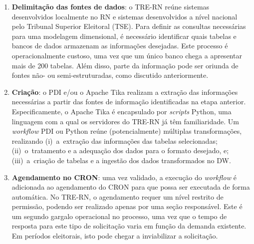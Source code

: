 \begin{enumerate}
\item \textbf{Delimitação das fontes de dados}: o TRE-RN reúne sistemas desenvolvidos localmente no RN e sistemas desenvolvidos a nível nacional pelo Tribunal Superior Eleitoral (TSE). Para definir as consultas necessárias para uma modelagem dimensional, é necessário identificar quais tabelas e bancos de dados armazenam as informações desejadas. Este processo é operacionalmente custoso, uma vez que um único banco chega a apresentar mais de 200 tabelas. Além disso, parte da informação pode ser oriunda de fontes não- ou semi-estruturadas, como discutido anteriormente.

\item \textbf{Criação}: o PDI e/ou o Apache Tika realizam a extração das informações necessárias a partir das fontes de informação identificadas na etapa anterior. Especificamente, o Apache Tika é encapsulado por \emph{scripts} Python, uma linguagem com a qual os servidores do TRE-RN já têm familiaridade. Um \emph{workflow} PDI ou Python reúne (potencialmente) múltiplas transformações, realizando (i)~a~extração das informações das tabelas selecionadas; (ii)~o~tratamento e a adequação dos dados para o formato desejado, e; (iii)~a~criação de tabelas e a ingestão dos dados transformados no DW. 

\item \textbf{Agendamento no CRON}: uma vez validado, a execução do \emph{workflow} é adicionada ao agendamento do CRON 
para que possa ser executada de forma automática. No TRE-RN, o agendamento requer um nível restrito de permissão, podendo ser realizado apenas por uma seção responsável. Este é um segundo gargalo operacional no processo, uma vez que o tempo de resposta para este tipo de solicitação varia em função da demanda existente. Em períodos eleitorais, isto pode chegar a inviabilizar a solicitação.


\end{enumerate}

